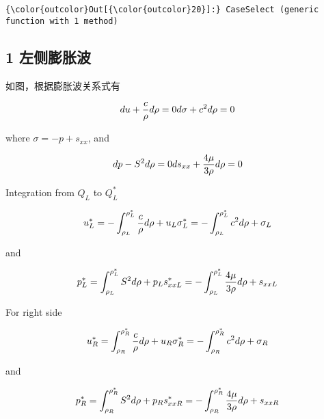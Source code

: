 \documentclass[11pt]{article}
\begin{document}
\begin{Verbatim}[commandchars=\\\{\}]
{\color{outcolor}Out[{\color{outcolor}20}]:} CaseSelect (generic function with 1 method)
\end{Verbatim}
            
    \subsection{1 左侧膨胀波}\label{ux5de6ux4fa7ux81a8ux80c0ux6ce2}

 如图，根据膨胀波关系式有

\begin{equation}
    du+\frac{c}{\rho} d\rho= 0\\
    d\sigma +c^2 d\rho = 0
\end{equation}

where \(\sigma = -p +s_{xx}\), and

\begin{equation}
    dp-S^2d\rho = 0\\
    ds_{xx}+\frac{4\mu}{3\rho} d\rho= 0 
    \end{equation}

Integration from \(Q_L\) to \(Q^*_L\)

\begin{equation}
u_L^* =- \int_{\rho_L}^{\rho^*_L}\frac{c}{\rho}d\rho + u_L\\
\sigma_L^* = -\int_{\rho_L}^{\rho^*_L} c^2 d\rho +\sigma_L
\end{equation}

and

\begin{equation}
p_L^* = \int_{\rho_L}^{\rho^*_L}S^2 d\rho + p_L\\
s_{xxL}^* = -\int_{\rho_L}^{\rho^*_L} \frac{4\mu}{3\rho} d\rho +s_{xxL}
\end{equation}

    For right side

\begin{equation}
u_R^* = \int_{\rho_R}^{\rho^*_R}\frac{c}{\rho}d\rho + u_R\\
\sigma_R^* = -\int_{\rho_R}^{\rho^*_R} c^2 d\rho +\sigma_R
\end{equation}

and

\begin{equation}
p_R^* = \int_{\rho_R}^{\rho^*_R}S^2 d\rho + p_R\\
s_{xxR}^* = -\int_{\rho_R}^{\rho^*_R} \frac{4\mu}{3\rho} d\rho +s_{xxR}
\end{equation}
\end{document}
